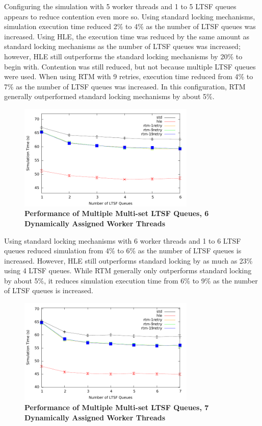 \documentclass[11pt]{book}
\begin{document}
Configuring the simulation with 5 worker threads and 1 to 5 LTSF queues appears
to reduce contention even more so.  Using standard locking mechanisms,
simulation execution time reduced 2\% to 4\% as the number of LTSF queues was
increased.  Using HLE, the execution time was reduced by the same amount as
standard locking mechanisms as the number of LTSF queues was increased; however,
HLE still outperforms the standard locking mechanisms by 20\% to begin with.
Contention was still reduced, but not because multiple LTSF queues were used.
When using RTM with 9 retries, execution time reduced from 4\% to 7\% as the
number of LTSF queues was increased.  In this configuration, RTM generally
outperformed standard locking mechanisms by about 5\%.

\begin{figure}
    \centering
    \graphicspath{ {./figures/} }
    \includegraphics[width=0.75\textwidth,keepaspectratio]{hugeepidemicsim-CONTmig-timeVSschedQs-multiset-6thread}
    \caption{\textbf{Performance of Multiple Multi-set LTSF Queues, 6 Dynamically Assigned Worker Threads}}
    \label{fig:contThrMig_timeVSschq_6threads}
\end{figure}

Using standard locking mechanisms with 6 worker threads and 1 to 6 LTSF queues
reduced simulation from 4\% to 6\% as the number of LTSF queues is increased.
However, HLE still outperforms standard locking by as much as 23\% using 4 LTSF
queues.  While RTM generally only outperforms standard locking by about 5\%, it
reduces simulation execution time from 6\% to 9\% as the number of LTSF queues
is increased.

\begin{figure}
    \centering
    \graphicspath{ {./figures/} }
    \includegraphics[width=0.75\textwidth,keepaspectratio]{hugeepidemicsim-CONTmig-timeVSschedQs-multiset-7thread}
    \caption{\textbf{Performance of Multiple Multi-set LTSF Queues, 7 Dynamically Assigned Worker Threads}}
    \label{fig:contThrMig_timeVSschq_7threads}
\end{figure}
\end{document}
